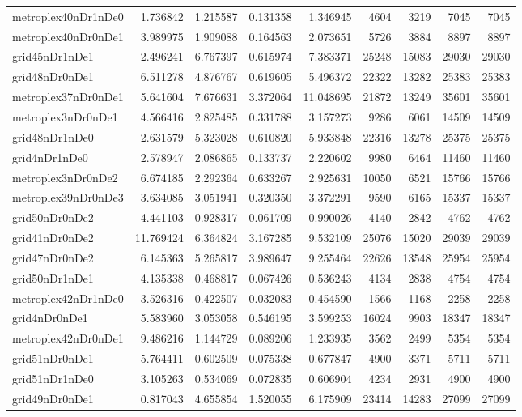 \begin{longtable}{|l|r|r|r|r|r|r|r|r|}
metroplex40nDr1nDe0 & 1.736842 & 1.215587 & 0.131358 & 1.346945 & 4604 & 3219 & 7045 & 7045 \\
metroplex40nDr0nDe1 & 3.989975 & 1.909088 & 0.164563 & 2.073651 & 5726 & 3884 & 8897 & 8897 \\
grid45nDr1nDe1 & 2.496241 & 6.767397 & 0.615974 & 7.383371 & 25248 & 15083 & 29030 & 29030 \\
grid48nDr0nDe1 & 6.511278 & 4.876767 & 0.619605 & 5.496372 & 22322 & 13282 & 25383 & 25383 \\
metroplex37nDr0nDe1 & 5.641604 & 7.676631 & 3.372064 & 11.048695 & 21872 & 13249 & 35601 & 35601 \\
metroplex3nDr0nDe1 & 4.566416 & 2.825485 & 0.331788 & 3.157273 & 9286 & 6061 & 14509 & 14509 \\
grid48nDr1nDe0 & 2.631579 & 5.323028 & 0.610820 & 5.933848 & 22316 & 13278 & 25375 & 25375 \\
grid4nDr1nDe0 & 2.578947 & 2.086865 & 0.133737 & 2.220602 & 9980 & 6464 & 11460 & 11460 \\
metroplex3nDr0nDe2 & 6.674185 & 2.292364 & 0.633267 & 2.925631 & 10050 & 6521 & 15766 & 15766 \\
metroplex39nDr0nDe3 & 3.634085 & 3.051941 & 0.320350 & 3.372291 & 9590 & 6165 & 15337 & 15337 \\
grid50nDr0nDe2 & 4.441103 & 0.928317 & 0.061709 & 0.990026 & 4140 & 2842 & 4762 & 4762 \\
grid41nDr0nDe2 & 11.769424 & 6.364824 & 3.167285 & 9.532109 & 25076 & 15020 & 29039 & 29039 \\
grid47nDr0nDe2 & 6.145363 & 5.265817 & 3.989647 & 9.255464 & 22626 & 13548 & 25954 & 25954 \\
grid50nDr1nDe1 & 4.135338 & 0.468817 & 0.067426 & 0.536243 & 4134 & 2838 & 4754 & 4754 \\
metroplex42nDr1nDe0 & 3.526316 & 0.422507 & 0.032083 & 0.454590 & 1566 & 1168 & 2258 & 2258 \\
grid4nDr0nDe1 & 5.583960 & 3.053058 & 0.546195 & 3.599253 & 16024 & 9903 & 18347 & 18347 \\
metroplex42nDr0nDe1 & 9.486216 & 1.144729 & 0.089206 & 1.233935 & 3562 & 2499 & 5354 & 5354 \\
grid51nDr0nDe1 & 5.764411 & 0.602509 & 0.075338 & 0.677847 & 4900 & 3371 & 5711 & 5711 \\
grid51nDr1nDe0 & 3.105263 & 0.534069 & 0.072835 & 0.606904 & 4234 & 2931 & 4900 & 4900 \\
grid49nDr0nDe1 & 0.817043 & 4.655854 & 1.520055 & 6.175909 & 23414 & 14283 & 27099 & 27099 \\

\end{longtable}
